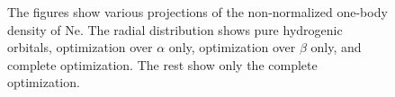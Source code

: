 \documentclass[aps,prc,twocolumn,floatfix]{revtex4}
\begin{document}
\begin{figure}[ht]
\caption[Optional caption for list of figures]{The figures show various projections of the non-normalized one-body density of Ne. The radial distribution shows pure hydrogenic orbitals, optimization over $\alpha$ only, optimization over $\beta$ only, and complete optimization. The rest show only the complete optimization.}
\label{fig:8}
\end{figure}
\end{document}
